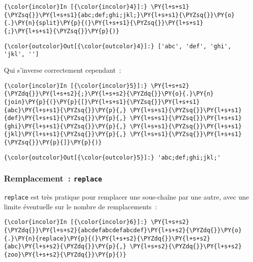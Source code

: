     \begin{Verbatim}[commandchars=\\\{\},frame=single,framerule=0.3mm,rulecolor=\color{cellframecolor}]
{\color{incolor}In [{\color{incolor}4}]:} \PY{l+s+s1}{\PYZsq{}}\PY{l+s+s1}{abc;def;ghi;jkl;}\PY{l+s+s1}{\PYZsq{}}\PY{o}{.}\PY{n}{split}\PY{p}{(}\PY{l+s+s1}{\PYZsq{}}\PY{l+s+s1}{;}\PY{l+s+s1}{\PYZsq{}}\PY{p}{)}
\end{Verbatim}


\begin{Verbatim}[commandchars=\\\{\},frame=single,framerule=0.3mm,rulecolor=\color{cellframecolor}]
{\color{outcolor}Out[{\color{outcolor}4}]:} ['abc', 'def', 'ghi', 'jkl', '']
\end{Verbatim}
            
    Qui s'inverse correctement cependant~:

    \begin{Verbatim}[commandchars=\\\{\},frame=single,framerule=0.3mm,rulecolor=\color{cellframecolor}]
{\color{incolor}In [{\color{incolor}5}]:} \PY{l+s+s2}{\PYZdq{}}\PY{l+s+s2}{;}\PY{l+s+s2}{\PYZdq{}}\PY{o}{.}\PY{n}{join}\PY{p}{(}\PY{p}{[}\PY{l+s+s1}{\PYZsq{}}\PY{l+s+s1}{abc}\PY{l+s+s1}{\PYZsq{}}\PY{p}{,} \PY{l+s+s1}{\PYZsq{}}\PY{l+s+s1}{def}\PY{l+s+s1}{\PYZsq{}}\PY{p}{,} \PY{l+s+s1}{\PYZsq{}}\PY{l+s+s1}{ghi}\PY{l+s+s1}{\PYZsq{}}\PY{p}{,} \PY{l+s+s1}{\PYZsq{}}\PY{l+s+s1}{jkl}\PY{l+s+s1}{\PYZsq{}}\PY{p}{,} \PY{l+s+s1}{\PYZsq{}}\PY{l+s+s1}{\PYZsq{}}\PY{p}{]}\PY{p}{)}
\end{Verbatim}


\begin{Verbatim}[commandchars=\\\{\},frame=single,framerule=0.3mm,rulecolor=\color{cellframecolor}]
{\color{outcolor}Out[{\color{outcolor}5}]:} 'abc;def;ghi;jkl;'
\end{Verbatim}
            
    \hypertarget{remplacement-replace}{%
\subsubsection{\texorpdfstring{Remplacement~:
\texttt{replace}}{Remplacement~: replace}}\label{remplacement-replace}}

    \texttt{replace} est très pratique pour remplacer une sous-chaîne par
une autre, avec une limite éventuelle sur le nombre de remplacements~:

    \begin{Verbatim}[commandchars=\\\{\},frame=single,framerule=0.3mm,rulecolor=\color{cellframecolor}]
{\color{incolor}In [{\color{incolor}6}]:} \PY{l+s+s2}{\PYZdq{}}\PY{l+s+s2}{abcdefabcdefabcdef}\PY{l+s+s2}{\PYZdq{}}\PY{o}{.}\PY{n}{replace}\PY{p}{(}\PY{l+s+s2}{\PYZdq{}}\PY{l+s+s2}{abc}\PY{l+s+s2}{\PYZdq{}}\PY{p}{,} \PY{l+s+s2}{\PYZdq{}}\PY{l+s+s2}{zoo}\PY{l+s+s2}{\PYZdq{}}\PY{p}{)}
\end{Verbatim}


